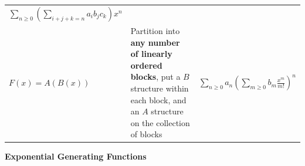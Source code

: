 \begin{longtable}[]{@{}lll@{}}
\begin{minipage}[t]{0.30\columnwidth}
\(\displaystyle\sum_{n\geq 0} \left( \displaystyle\sum_{i+j+k=n} a_i b_j c_k\right) {x^n}\)\strut
\end{minipage}\tabularnewline
\begin{minipage}[t]{0.30\columnwidth}\raggedright
\(F(x) = A(B(x))\)\strut
\end{minipage} & \begin{minipage}[t]{0.30\columnwidth}\raggedright
Partition into \textbf{any number of linearly ordered blocks}, put a
\(B\) structure within each block, and an \(A\) structure on the
collection of blocks\strut
\end{minipage} & \begin{minipage}[t]{0.30\columnwidth}\raggedright
\(\displaystyle\sum_{n\geq 0} a_n {\left( \displaystyle\sum_{m\geq 0} b_m \frac{x^m}{m!}\right)^n}\)\strut
\end{minipage}\tabularnewline
\bottomrule
\end{longtable}

\textbf{Exponential Generating Functions}

